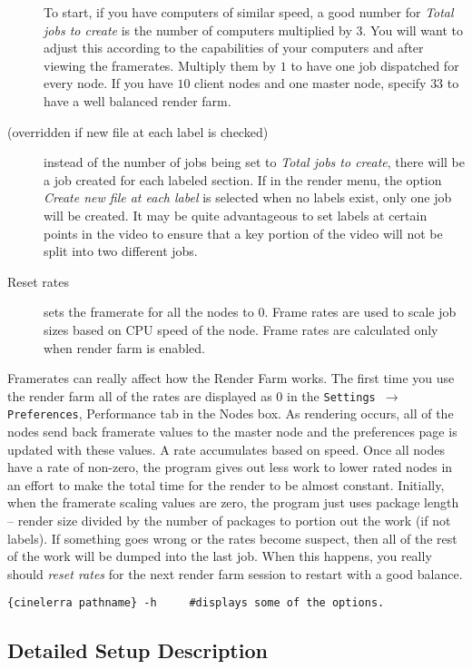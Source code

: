\begin{description}
    To start, if you have computers of similar speed, a good number for \textit{Total jobs to create} is the number of computers multiplied by $3$.  You will want to adjust this according to the capabilities of your computers and after viewing the framerates.  Multiply them by $1$ to have one job dispatched for every node.  If you have $10$ client nodes and one master node, specify $33$ to have a well balanced render farm.
    \item[(overridden if new file at each label is checked)] instead of the number of jobs being set to \textit{Total jobs to create}, there will be a job created for each labeled section.  If in the render menu, the option \textit{Create new file at each label} is selected when no labels exist, only one job will be created.  It may be quite advantageous to set labels at certain points in the video to ensure that a key portion of the video will not be split into two different jobs.
    \item[Reset rates] sets the framerate for all the nodes to $0$.  Frame rates are used to scale job sizes based on CPU speed of the node.  Frame rates are calculated only when render farm is enabled.
\end{description}

Framerates can really affect how the Render Farm works.  The first time you use the render farm all of the rates are displayed as $0$ in the \texttt{Settings $\rightarrow$ Preferences}, Performance tab in the Nodes box.  As rendering occurs, all of the nodes send back framerate values to the master node and the preferences page is updated with these values.  A rate accumulates based on speed.  Once all nodes have a rate of non-zero, the program gives out less work to lower rated nodes in an effort to make the total time for the render to be almost constant.
Initially, when the framerate scaling values are zero, the program just uses package length -- render size
divided by the number of packages to portion out the work (if not labels).  If something goes wrong or the rates become suspect, then all of the rest of the work will be dumped into the last job.  When this happens, you really should \textit{reset rates} for the next render farm session to restart with a good balance.

\begin{lstlisting}[style=sh]
    {cinelerra pathname} -h     #displays some of the options.
\end{lstlisting}

\subsection{Detailed Setup Description}%
\label{sub:detailed_setup_description}

